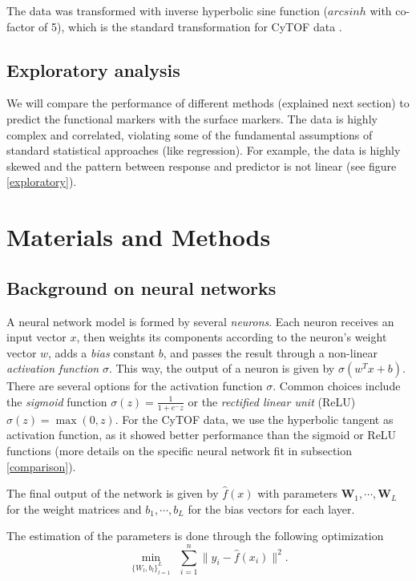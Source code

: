 \documentclass[conference]{IEEEtran}
\begin{document}
The data was transformed with inverse hyperbolic sine function
($arcsinh$ with co-factor of 5), which is the standard transformation
for CyTOF data \cite{Bendall2011}.



\subsection{Exploratory analysis}

We will compare the performance of different methods (explained next
section) to predict the functional markers with the surface markers.
The data is highly complex and correlated, violating some of the
fundamental assumptions of standard statistical approaches (like
regression). For example, the data is highly skewed and the pattern
between response and predictor is not linear (see figure
\ref{exploratory}). 


\section{Materials and Methods}

\subsection{Background on neural networks}

A neural network model is formed by several {\em neurons}. Each neuron
receives an input vector $x$, then weights its components according to
the neuron's weight vector $w$, adds a {\em bias} constant $b$, and
passes the result through a non-linear {\em activation function}
$\sigma$. This way, the output of a neuron is given by $\sigma(w^Tx +
b)$. There are several options for the activation function
$\sigma$. Common choices include the {\em sigmoid} function
$\sigma(z)=\frac{1}{1+e^-z}$ or the {\em rectified linear unit} (ReLU)
$\sigma(z)=\max(0,z)$. For the CyTOF data, we use the hyperbolic
tangent as activation function, as it showed better performance than
the sigmoid or ReLU functions (more details on the specific neural
network fit in subsection \ref{comparison}).

The final output of the network is given by $\hat{f}(x)$ with
parameters $\mathbf{W}_1,\cdots,\mathbf{W}_L$ for the weight matrices
and $b_1,\cdots,b_L$ for the bias vectors for each layer.

The estimation of the parameters is done through the following
optimization
\begin{equation}
\min_{\{W_l,b_l\}_{l=1}^L} \ \ \sum_{i=1}^n \| y_i-\hat{f}(x_i) \|^2.
\end{equation}
\end{document}

